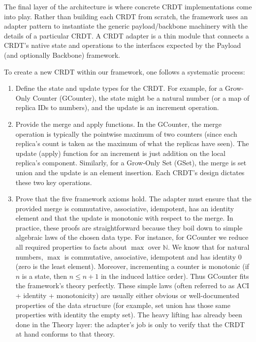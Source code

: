 The final layer of the architecture is where concrete CRDT implementations come into play. Rather than building each CRDT from scratch, the framework uses an adapter pattern to instantiate the generic payload/backbone machinery with the details of a particular CRDT. A CRDT adapter is a thin module that connects a CRDT’s native state and operations to the interfaces expected by the Payload (and optionally Backbone) framework.

To create a new CRDT within our framework, one follows a systematic process:

\begin{enumerate}
  \item Define the state and update types for the CRDT. For example, for a Grow-Only Counter (GCounter), the state might be a natural number (or a map of replica IDs to numbers), and the update is an increment operation.
  \item Provide the merge and apply functions. In the GCounter, the merge operation is typically the pointwise maximum of two counters (since each replica’s count is taken as the maximum of what the replicas have seen). The update (apply) function for an increment is just addition on the local replica’s component. Similarly, for a Grow-Only Set (GSet), the merge is set union and the update is an element insertion. Each CRDT’s design dictates these two key operations.
  \item Prove that the five framework axioms hold. The adapter must ensure that the provided merge is commutative, associative, idempotent, has an identity element and that the update is monotonic with respect to the merge. In practice, these proofs are straightforward because they boil down to simple algebraic laws of the chosen data type. For instance, for GCounter we reduce all required properties to facts about $\max$ over $\mathbb{N}$. We know that for natural numbers, $\max$ is commutative, associative, idempotent and has identity $0$ (zero is the least element). Moreover, incrementing a counter is monotonic (if $n$ is a state, then $n \leq n+1$ in the induced lattice order). Thus GCounter fits the framework’s theory perfectly. These simple laws (often referred to as ACI + identity + monotonicity) are usually either obvious or well-documented properties of the data structure (for example, set union has those same properties with identity the empty set). The heavy lifting has already been done in the Theory layer: the adapter’s job is only to verify that the CRDT at hand conforms to that theory.

\end{enumerate}
